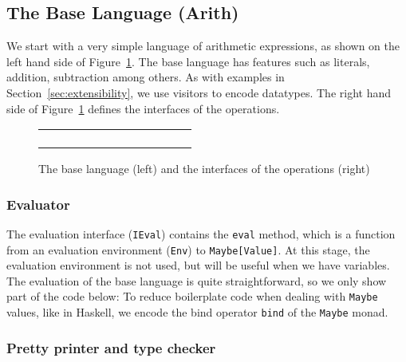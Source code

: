 \subsection{The Base Language (Arith)}

We start with a very simple language of arithmetic expressions, as shown on the
left hand side of Figure~\ref{fig:base-lang}. The base language has features
such as literals, addition, subtraction among others. As with examples in
Section~\ref{sec:extensibility}, we use visitors to encode datatypes. The
right hand side of Figure~\ref{fig:base-lang} defines the interfaces of the
operations.

\begin{figure}[t]
  \centering
  \begin{tabular}{cc}
    \begin{subfigure}[t]{0.45\textwidth}
      \centering
    \end{subfigure}
    &
    \begin{subfigure}[t]{0.45\textwidth}
      \centering
    \end{subfigure}
  \end{tabular}
  \caption{The base language (left) and the interfaces of the operations (right)}
  \label{fig:base-lang}
\end{figure}

\subsubsection{Evaluator}

The evaluation interface (\lstinline{IEval}) contains the \lstinline{eval}
method, which is a function from an evaluation environment (\lstinline{Env}) to
\lstinline{Maybe[Value]}. At this stage, the evaluation environment is not used,
but will be useful when we have variables. The evaluation of the base language
is quite straightforward, so we only show part of the code below:
To reduce boilerplate code when dealing with \lstinline{Maybe} values, like in
Haskell, we encode the bind operator \lstinline{bind} of the \lstinline{Maybe}
monad.

\subsubsection{Pretty printer and type checker}

